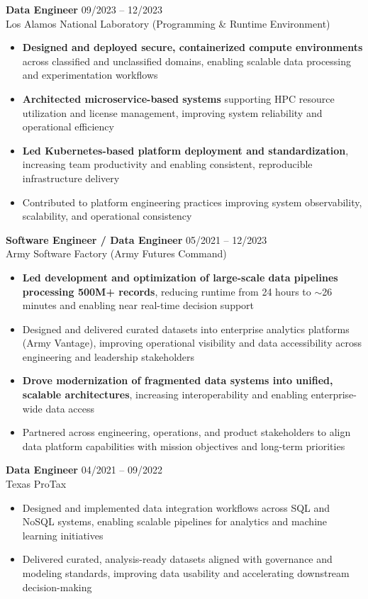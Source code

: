 \textbf{Data Engineer} \hfill 09/2023 -- 12/2023 \\
Los Alamos National Laboratory (Programming \& Runtime Environment)
\begin{itemize}
    \item \textbf{Designed and deployed secure, containerized compute environments} across classified and unclassified domains, enabling scalable data processing and experimentation workflows
    \item \textbf{Architected microservice-based systems} supporting HPC resource utilization and license management, improving system reliability and operational efficiency
    \item \textbf{Led Kubernetes-based platform deployment and standardization}, increasing team productivity and enabling consistent, reproducible infrastructure delivery
    \item Contributed to platform engineering practices improving system observability, scalability, and operational consistency
\end{itemize}
\vspace{0.3em}

\textbf{Software Engineer / Data Engineer} \hfill 05/2021 -- 12/2023 \\
Army Software Factory (Army Futures Command)
\begin{itemize}
    \item \textbf{Led development and optimization of large-scale data pipelines processing 500M+ records}, reducing runtime from 24 hours to $\sim$26 minutes and enabling near real-time decision support
    \item Designed and delivered curated datasets into enterprise analytics platforms (Army Vantage), improving operational visibility and data accessibility across engineering and leadership stakeholders
    \item \textbf{Drove modernization of fragmented data systems into unified, scalable architectures}, increasing interoperability and enabling enterprise-wide data access
    \item Partnered across engineering, operations, and product stakeholders to align data platform capabilities with mission objectives and long-term priorities
\end{itemize}
\vspace{0.3em}

\textbf{Data Engineer} \hfill 04/2021 -- 09/2022 \\
Texas ProTax
\begin{itemize}
    \item Designed and implemented data integration workflows across SQL and NoSQL systems, enabling scalable pipelines for analytics and machine learning initiatives
    \item Delivered curated, analysis-ready datasets aligned with governance and modeling standards, improving data usability and accelerating downstream decision-making
\end{itemize}
\vspace{0.3em}

